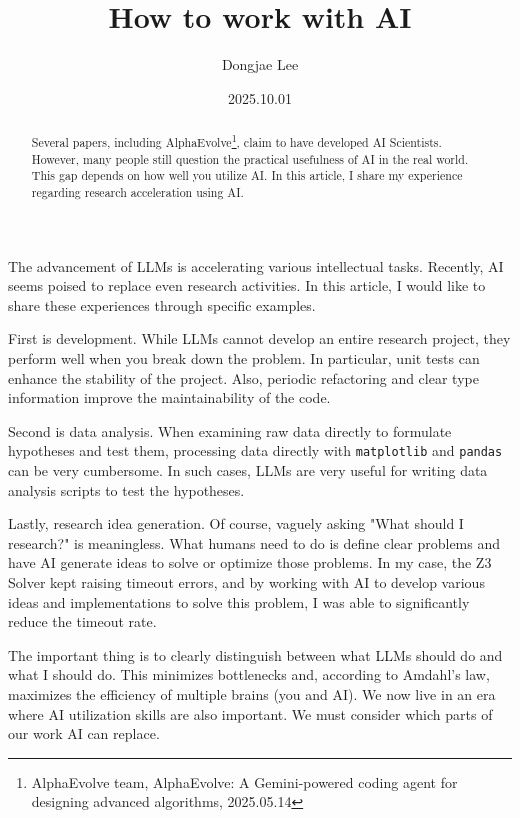 \documentclass[11pt, oneside]{article}   	%
\title{How to work with AI}
\author{Dongjae Lee}
\date{2025.10.01}
\begin{document}
\maketitle


\begin{abstract}
	Several papers, including AlphaEvolve\footnote{AlphaEvolve team, AlphaEvolve: A Gemini-powered coding agent for designing advanced algorithms, 2025.05.14}, claim to have developed AI Scientists.
	However, many people still question the practical usefulness of AI in the real world.
	This gap depends on how well you utilize AI.
	In this article, I share my experience regarding research acceleration using AI.
\end{abstract}

The advancement of LLMs is accelerating various intellectual tasks.
Recently, AI seems poised to replace even research activities.
In this article, I would like to share these experiences through specific examples.



First is development. While LLMs cannot develop an entire research project, they perform well when you break down the problem.
In particular, unit tests can enhance the stability of the project.
Also, periodic refactoring and clear type information improve the maintainability of the code.



Second is data analysis.
When examining raw data directly to formulate hypotheses and test them, processing data directly with \texttt{matplotlib} and \texttt{pandas} can be very cumbersome.
In such cases, LLMs are very useful for writing data analysis scripts to test the hypotheses.



Lastly, research idea generation.
Of course, vaguely asking "What should I research?" is meaningless.
What humans need to do is define clear problems and have AI generate ideas to solve or optimize those problems.
In my case, the Z3 Solver kept raising timeout errors, and by working with AI to develop various ideas and implementations to solve this problem, I was able to significantly reduce the timeout rate.



The important thing is to clearly distinguish between what LLMs should do and what I should do. This minimizes bottlenecks and, according to Amdahl's law, maximizes the efficiency of multiple brains (you and AI). We now live in an era where AI utilization skills are also important. We must consider which parts of our work AI can replace.
\end{document}
